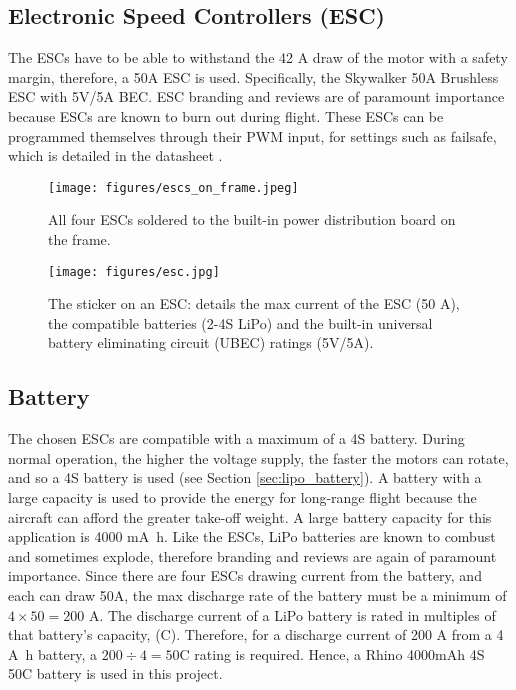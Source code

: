\subsection*{Electronic Speed Controllers (ESC)} 
The \acp{ESC} have to be able to withstand the 42 \si{\ampere} draw of the motor with a safety margin, therefore, a 50A \ac{ESC} is used. Specifically, the Skywalker 50A Brushless ESC with 5V/5A BEC. \ac{ESC} branding and reviews are of paramount importance because \acp{ESC} are known to burn out during flight. These \acp{ESC} can be programmed themselves through their PWM input, for settings such as failsafe, which is detailed in the datasheet \cite{esc_datasheet}.

\begin{figure}[htpb!]
    \centering
    \texttt{[image: figures/escs\_on\_frame.jpeg]}
    \caption{All four \acp{ESC} soldered to the built-in power distribution board on the frame.}
    \label{fig:escs_on_frame}
\end{figure}

\begin{figure}[htpb!]
    \centering
    \texttt{[image: figures/esc.jpg]}
    \caption{The sticker on an \ac{ESC}: details the max current of the \ac{ESC} (50 \si{\ampere}), the compatible batteries (2-4S \ac{LiPo}) and the built-in universal battery eliminating circuit (UBEC) ratings (5\si{\volt}/5\si{\ampere}).}
    \label{fig:esc}
\end{figure}



\subsection*{Battery}
The chosen \acp{ESC} are compatible with a maximum of a 4S battery. During normal operation, the higher the voltage supply, the faster the motors can rotate, and so a 4S battery is used (see Section \ref{sec:lipo_battery}). A battery with a large capacity is used to provide the energy for long-range flight because the aircraft can afford the greater take-off weight. A large battery capacity for this application is 4000 \si{\milli\ampere\hour}. Like the ESCs, LiPo batteries are known to combust and sometimes explode, therefore branding and reviews are again of paramount importance. Since there are four ESCs drawing current from the battery, and each can draw 50A, the max discharge rate of the battery must be a minimum of $4 \times 50 = 200$ \si{\ampere}. The discharge current of a LiPo battery is rated in multiples of that battery's capacity, (C). Therefore, for a discharge current of 200 \si{\ampere} from a 4 \si{\ampere\hour} battery, a $200 \div 4 = 50$C rating is required. Hence, a Rhino 4000mAh 4S 50C battery is used in this project.

